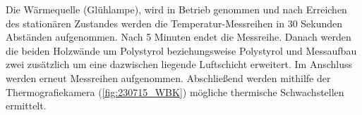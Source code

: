 Die Wärmequelle (Glühlampe), wird in Betrieb genommen und nach Erreichen des stationären Zustandes werden die Temperatur-Messreihen in 30 Sekunden Abständen aufgenommen. Nach 5 Minuten endet die Messreihe.
 Danach werden die beiden Holzwände um Polystyrol beziehungsweise Polystyrol und Messaufbau zwei zusätzlich um eine dazwischen liegende Luftschicht erweitert.
Im Anschluss werden erneut Messreihen aufgenommen. 
Abschließend werden mithilfe der Thermografiekamera (\autoref{fig:230715_WBK}) mögliche thermische Schwachstellen ermittelt.